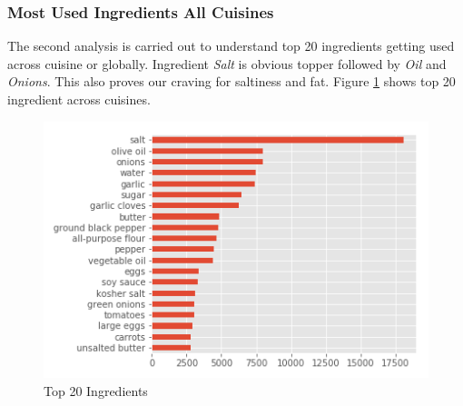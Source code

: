 \documentclass[sigconf]{acmart}
\begin{document}
\subsubsection{Most Used Ingredients All Cuisines}
The second analysis is carried out to understand top 20 ingredients getting used across cuisine or globally. Ingredient \emph{Salt} is obvious topper followed by \emph{Oil} and \emph{Onions}. This also proves our craving for saltiness and fat. Figure \ref{f:Ingredient_Distribution} shows top 20 ingredient across cuisines. 
\begin{figure}[!ht]
  \centering\includegraphics[width=\columnwidth]{images/Ingredient_Distribution.png}
  \caption{Top 20 Ingredients }\label{f:Ingredient_Distribution}
\end{figure}
\end{document}
